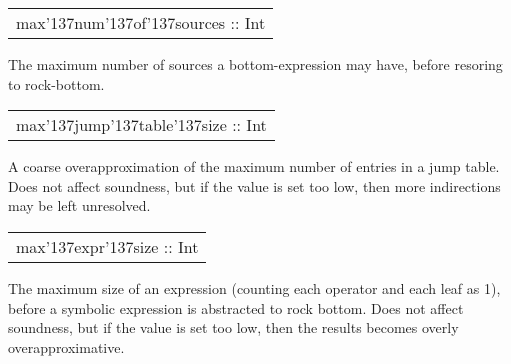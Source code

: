\begin{haddockdesc}
\item[\begin{tabular}{@{}l}
max{\char '137}num{\char '137}of{\char '137}sources :: Int
\end{tabular}]
{\haddockbegindoc
The maximum number of sources a bottom-expression may have, before resoring to rock-bottom.\par}
\end{haddockdesc}
\begin{haddockdesc}
\item[\begin{tabular}{@{}l}
max{\char '137}jump{\char '137}table{\char '137}size :: Int
\end{tabular}]
{\haddockbegindoc
A coarse overapproximation of the maximum number of entries in a jump table.
 Does not affect soundness, but if the value is set too low, then more indirections may be left unresolved.\par}
\end{haddockdesc}
\begin{haddockdesc}
\item[\begin{tabular}{@{}l}
max{\char '137}expr{\char '137}size :: Int
\end{tabular}]
{\haddockbegindoc
The maximum size of an expression (counting each operator and each leaf as 1), before a symbolic expression is abstracted to rock bottom.
 Does not affect soundness, but if the value is set too low, then the results becomes overly overapproximative.\par}
\end{haddockdesc}